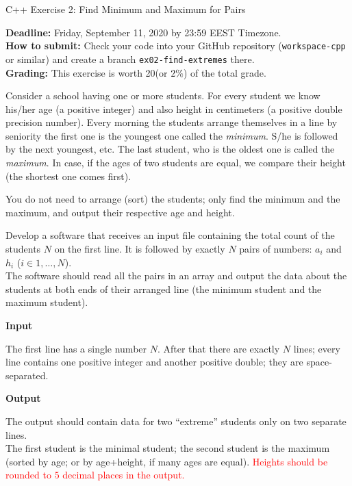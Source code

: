 \documentclass[11pt]{article}
\begin{document}
\thispagestyle{empty}



\begin{center}
{\Large C++ Exercise 2: Find Minimum and Maximum for Pairs}
\end{center}

{\bf Deadline:} Friday, September 11, 2020 by 23:59 EEST Timezone.\\ 
{\bf How to submit:} Check your code into your GitHub repository 
({\tt workspace-cpp} or similar) and create a branch {\tt ex02-find-extremes} there.\\
{\bf Grading:} This exercise is worth 20\textperthousand (or $2\%$) of the total grade.

\vspace{10pt}
{\small
Consider a school having one or more students. For every student
we know his/her age (a positive integer) and also
height in centimeters (a positive double precision number). 
Every morning the students arrange themselves in a line
by seniority \textendash{} the first one is the youngest one
called the {\em minimum}. S/he is followed by the next youngest, etc. 
The last student, who is the oldest one is called the {\em maximum}. 
In case, if the ages of two students are equal, we compare 
their height (the shortest one comes first). 

You do not need to arrange (sort) the students; only find the minimum and the 
maximum, and output their respective age and height.
}

\vspace{10pt}
Develop a software that receives an input file containing
the total count of the students $N$ on the first line. It is 
followed by exactly $N$ pairs
of numbers: $a_i$ and $h_i$ ($i \in 1,\ldots,N$).\\
The software should read all the pairs in an array and output the 
data about the students at both ends of their arranged line
(the minimum student and the maximum student).



\vspace{10pt}
{\bf Input}

The first line has a single number $N$. 
After that there are exactly $N$ lines; every line contains one positive integer and another positive double; 
they are space-separated. 

\vspace{10pt}
{\bf Output}

The output should contain data for two ``extreme'' students only on two separate lines.\\
The first student is the minimal student; the second student is the maximum
(sorted by age; or by age+height, if many ages are equal). 
\textcolor{red}{Heights should be rounded to $5$ decimal places in the output.}
\end{document}
